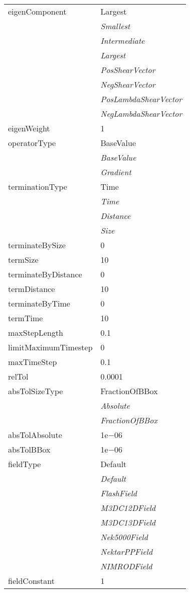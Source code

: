 \documentclass[10pt,a4paper]{report}
\begin{document}
\begin{longtable}{ll}
eigenComponent  &  Largest   \\
 & {\it  Smallest} \\
 & {\it  Intermediate} \\
 & {\it  Largest} \\
 & {\it  PosShearVector} \\
 & {\it  NegShearVector} \\
 & {\it  PosLambdaShearVector} \\
 & {\it  NegLambdaShearVector} \\
eigenWeight  &  1 \\
operatorType  &  BaseValue   \\
 & {\it  BaseValue} \\
 & {\it  Gradient} \\
terminationType  &  Time   \\
 & {\it  Time} \\
 & {\it  Distance} \\
 & {\it  Size} \\
terminateBySize  &  0 \\
termSize  &  10 \\
terminateByDistance  &  0 \\
termDistance  &  10 \\
terminateByTime  &  0 \\
termTime  &  10 \\
maxStepLength  &  0.1 \\
limitMaximumTimestep  &  0 \\
maxTimeStep  &  0.1 \\
relTol  &  0.0001 \\
absTolSizeType  &  FractionOfBBox   \\
 & {\it  Absolute} \\
 & {\it  FractionOfBBox} \\
absTolAbsolute  &  1e$-$06 \\
absTolBBox  &  1e$-$06 \\
fieldType  &  Default   \\
 & {\it  Default} \\
 & {\it  FlashField} \\
 & {\it  M3DC12DField} \\
 & {\it  M3DC13DField} \\
 & {\it  Nek5000Field} \\
 & {\it  NektarPPField} \\
 & {\it  NIMRODField} \\
fieldConstant  &  1 \\

\end{longtable}
\end{document}
